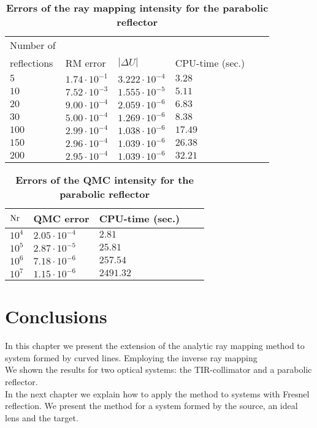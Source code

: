 \begin{table}[t] 
\centering
\caption{\bf Errors of the ray mapping intensity for the parabolic reflector}
\begin{tabular}{llllll}
 \hline  Number of\\
 reflections\;  & RM error & $|\Delta U|$ & CPU-time (sec.)\\
  \hline 
 $5$      & $1.74\cdot 10^{-1}$  & $3.222\cdot10^{-4}$& $3.28$  \\
$10$      & $7.52\cdot 10^{-3}$ & $1.555\cdot 10^{-5}$& $5.11$   \\
$20$      & $9.00 \cdot 10^{-4}$ & $2.059\cdot 10^{-6}$& $6.83$  \\
 $30$    & $5.00 \cdot 10^{-4}$ & $1.269\cdot 10^{-6}$ & $8.38$  \\
$100$    & $2.99 \cdot 10^{-4}$ & $1.038\cdot 10^{-6}$ & $17.49$  \\
$150$    & $2.96 \cdot 10^{-4}$ & $1.039\cdot 10^{-6}$ & $26.38$  \\
$200$    & $2.95 \cdot 10^{-4}$ & $1.039\cdot 10^{-6}$ & $32.21$  \\
 \hline
 \end{tabular}
 \label{tab:ray_mapping_pr}
 \end{table}
\begin{table}[t] 
\centering
\caption{\bf Errors of the QMC intensity for the parabolic reflector}
\begin{tabular}{lllll}
 \hline  $\textrm{Nr}$\;  & QMC error & CPU-time (sec.)\\
  \hline 
$10^4$     & $2.05\cdot 10^{-4}$   & $2.81$  \\
$10^5$     & $2.87\cdot 10^{-5}$   & $25.81$   \\
$10^6$     & $7.18 \cdot 10^{-6}$  & $257.54$  \\
$10^7$     & $1.15 \cdot 10^{-6}$  & $2491.32$  \\
 \hline
 \end{tabular}
 \label{tab:qmc_raymapping_pr}
 \end{table}
\section{Conclusions}
In this chapter we present the extension of the analytic ray mapping method to system formed by curved lines. Employing the inverse ray mapping 
\\ \indent
We shown the results for two optical systems: the TIR-collimator and a parabolic reflector.
\\ \indent In the next chapter we explain how to apply the method to systems with Fresnel reflection. We present the method for a system formed by the source, an ideal lens and the target.














